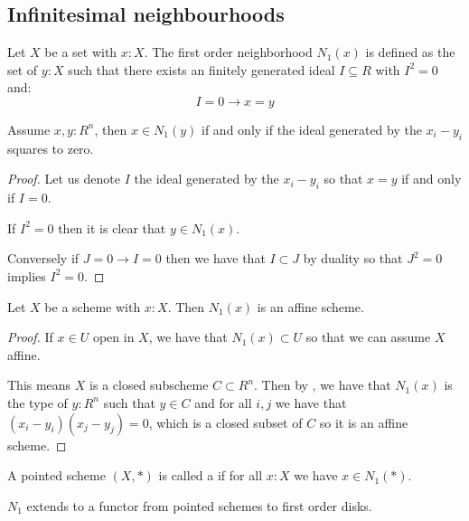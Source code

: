 \subsection{Infinitesimal neighbourhoods}

\begin{definition}
Let $X$ be a set with $x:X$. The first order neighborhood $N_1(x)$ is defined as the set of $y:X$ such that there exists an finitely generated ideal $I\subseteq R$ with $I^{2}=0$ and:
\[I=0 \to x=y\]
\end{definition}

\begin{lemma}\label{first-order-square-zero}
Assume $x,y:R^n$, then $x\in N_1(y)$ if and only if the ideal generated by the $x_i-y_i$ squares to zero.
\end{lemma}

\begin{proof}
Let us denote $I$ the ideal generated by the $x_i-y_i$ so that $x=y$ if and only if $I=0$. 

If $I^2=0$ then it is clear that $y\in N_1(x)$.

Conversely if $J=0 \to I=0$ then we have that $I\subset J$ by duality so that $J^2=0$ implies $I^2=0$.
\end{proof}

\begin{lemma}\label{first-order-schemes}
Let $X$ be a scheme with $x:X$. Then $N_1(x)$ is an affine scheme. 
\end{lemma}

\begin{proof}
If $x\in U$ open in $X$, we have that $N_1(x)\subset U$ so that we can assume $X$ affine.

This means $X$ is a closed subscheme $C\subset R^n$. Then by , we have that $N_1(x)$ is the type of $y:R^n$ such that $y\in C$ and for all $i,j$ we have that $(x_i-y_i)(x_j-y_j) = 0$, which is a closed subset of $C$ so it is an affine scheme.
\end{proof}

\begin{definition}
A pointed scheme $(X,*)$ is called a  if for all $x:X$ we have $x\in N_1(*)$.
\end{definition}

\begin{lemma}
  \label{N1-functor}
  $N_1$ extends to a functor from pointed schemes to first order disks.
\end{lemma}


